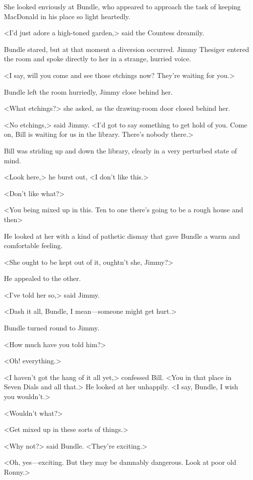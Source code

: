 She looked enviously at Bundle, who appeared to approach the task of keeping MacDonald in his place so light heartedly.

<I'd just adore a high-toned garden,> said the Countess dreamily.

Bundle stared, but at that moment a diversion occurred. Jimmy Thesiger entered the room and spoke directly to her in a strange, hurried voice.

<I say, will you come and see those etchings now? They're waiting for you.>

Bundle left the room hurriedly, Jimmy close behind her.

<What etchings?> she asked, as the drawing-room door closed behind her.

<No etchings,> said Jimmy. <I'd got to say something to get hold of you. Come on, Bill is waiting for us in the library. There's nobody there.>

Bill was striding up and down the library, clearly in a very perturbed state of mind.

<Look here,> he burst out, <I don't like this.>

<Don't like what?>

<You being mixed up in this. Ten to one there's going to be a rough house and then\longdash>

He looked at her with a kind of pathetic dismay that gave Bundle a warm and comfortable feeling.

<She ought to be kept out of it, oughtn't she, Jimmy?>

He appealed to the other.

<I've told her so,> said Jimmy.

<Dash it all, Bundle, I mean—someone might get hurt.>

Bundle turned round to Jimmy.

<How much have you told him?>

<Oh! everything.>

<I haven't got the hang of it all yet,> confessed Bill. <You in that place in Seven Dials and all that.> He looked at her unhappily. <I say, Bundle, I wish you wouldn't.>

<Wouldn't what?>

<Get mixed up in these sorts of things.>

<Why not?> said Bundle. <They're exciting.>

<Oh, yes—exciting. But they may be damnably dangerous. Look at poor old Ronny.>

